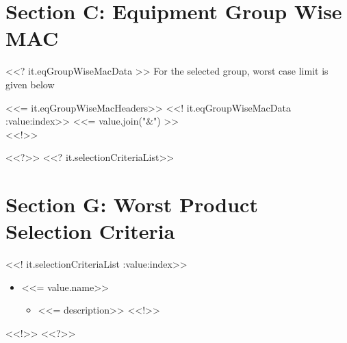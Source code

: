 \documentclass{article}
\begin{document}
        \section{Section C: Equipment Group Wise MAC}
        <<? it.eqGroupWiseMacData >>
        For the selected group, worst case limit is given below
        \begin{longtable}[l]{<<= it.eqGroupWiseMacHeaders>>} \hline
        <<! it.eqGroupWiseMacData :value:index>>
            <<= value.join("&") >>\\\hline
        <<!>>
        \end{longtable}
        <<?>>
        <<? it.selectionCriteriaList>>
        \newpage
        \section{Section G: Worst Product Selection Criteria}
        <<! it.selectionCriteriaList :value:index>>
            \begin{itemize} 
            \item <<= value.name>>
                \begin{itemize}
                <<! value.descriptions :description:idex>>
                    \item <<= description>>
                <<!>>
                \end{itemize}
            \end{itemize}
        <<!>>
        <<?>>
        \newpage
\end{document}
